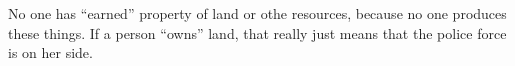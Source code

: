 No one has ``earned'' property of land or othe resources, because no one produces these things.
If a person ``owns'' land, that really just means that the police force is on her side.
